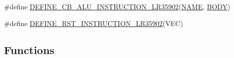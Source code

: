 \begin{DoxyCompactItemize}
\item 
\#define \mbox{\hyperlink{isa-lr35902_8c_ad6f60c80260fd54f80082ddc8002bb51}{D\+E\+F\+I\+N\+E\+\_\+\+C\+B\+\_\+\+A\+L\+U\+\_\+\+I\+N\+S\+T\+R\+U\+C\+T\+I\+O\+N\+\_\+\+L\+R35902}}(\mbox{\hyperlink{inflate_8h_a164ea0159d5f0b5f12a646f25f99eceaa67bc2ced260a8e43805d2480a785d312}{N\+A\+ME}},  \mbox{\hyperlink{gzlog_8c_aa6bdf6a6d9916c343e1e17774d84a156}{B\+O\+DY}})
\item 
\#define \mbox{\hyperlink{isa-lr35902_8c_a6e43808ab3a1f949e5ff1e06fe89ca83}{D\+E\+F\+I\+N\+E\+\_\+\+R\+S\+T\+\_\+\+I\+N\+S\+T\+R\+U\+C\+T\+I\+O\+N\+\_\+\+L\+R35902}}(V\+EC)
\end{DoxyCompactItemize}
\subsection*{Functions}
